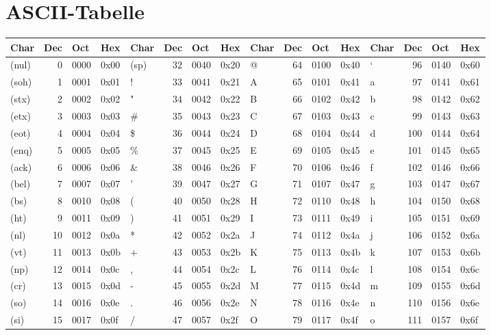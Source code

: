 \documentclass{article}
\begin{document}
	\section{ASCII-Tabelle} %
		\begin{tabular}{lrll|lrll|lrll|lrll}
		\hline
		Char & Dec & Oct & Hex & Char & Dec & Oct & Hex & Char & Dec & Oct & Hex & Char & Dec & Oct & Hex\\
		\hline
		(nul) & 0 & 0000 & 0x00 & (sp) & 32 & 0040 & 0x20 & @ & 64 & 0100 & 0x40 & ` & 96 & 0140 & 0x60\\
		(soh) & 1 & 0001 & 0x01 & ! & 33 & 0041 & 0x21 & A & 65 & 0101 & 0x41 & a & 97 & 0141 & 0x61\\
		(stx) & 2 & 0002 & 0x02 & " & 34 & 0042 & 0x22 & B & 66 & 0102 & 0x42 & b & 98 & 0142 & 0x62\\
		(etx) & 3 & 0003 & 0x03 & \# & 35 & 0043 & 0x23 & C & 67 & 0103 & 0x43 & c & 99 & 0143 & 0x63\\
		(eot) & 4 & 0004 & 0x04 & \$ & 36 & 0044 & 0x24 & D & 68 & 0104 & 0x44 & d & 100 & 0144 & 0x64\\
		(enq) & 5 & 0005 & 0x05 & \% & 37 & 0045 & 0x25 & E & 69 & 0105 & 0x45 & e & 101 & 0145 & 0x65\\
		(ack) & 6 & 0006 & 0x06 & \& & 38 & 0046 & 0x26 & F & 70 & 0106 & 0x46 & f & 102 & 0146 & 0x66\\
		(bel) & 7 & 0007 & 0x07 & ' & 39 & 0047 & 0x27 & G & 71 & 0107 & 0x47 & g & 103 & 0147 & 0x67\\
		(bs) & 8 & 0010 & 0x08 & ( & 40 & 0050 & 0x28 & H & 72 & 0110 & 0x48 & h & 104 & 0150 & 0x68\\
		(ht) & 9 & 0011 & 0x09 & ) & 41 & 0051 & 0x29 & I & 73 & 0111 & 0x49 & i & 105 & 0151 & 0x69\\
		(nl) & 10 & 0012 & 0x0a & * & 42 & 0052 & 0x2a & J & 74 & 0112 & 0x4a & j & 106 & 0152 & 0x6a\\
		(vt) & 11 & 0013 & 0x0b & + & 43 & 0053 & 0x2b & K & 75 & 0113 & 0x4b & k & 107 & 0153 & 0x6b\\
		(np) & 12 & 0014 & 0x0c & , & 44 & 0054 & 0x2c & L & 76 & 0114 & 0x4c & l & 108 & 0154 & 0x6c\\
		(cr) & 13 & 0015 & 0x0d & - & 45 & 0055 & 0x2d & M & 77 & 0115 & 0x4d & m & 109 & 0155 & 0x6d\\
		(so) & 14 & 0016 & 0x0e & . & 46 & 0056 & 0x2e & N & 78 & 0116 & 0x4e & n & 110 & 0156 & 0x6e\\
		(si) & 15 & 0017 & 0x0f & / & 47 & 0057 & 0x2f & O & 79 & 0117 & 0x4f & o & 111 & 0157 & 0x6f\\

\end{tabular}
\end{document}
